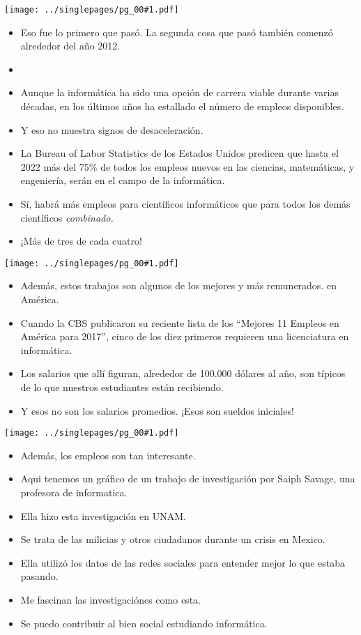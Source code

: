 \documentclass[12pt]{article}
\newcommand{\bi}{\begin{itemize}}
\newcommand{\ei}{\end{itemize}}
\newcommand{\cue}{\mbox{}
  \fbox{\sf Next slide}
}
\newcommand{\fig}[1]{
  \newpage  
  \begin{center}
    \texttt{[image: ../singlepages/pg\_00\#1.pdf]}
  \end{center}
  
}
\begin{document}
\fig{09}

\bi
\item Eso fue lo primero que pasó.
La segunda cosa que pasó también comenzó
  alrededor del año 2012.
\item \cue
\item
  Aunque la informática ha sido una opción
de carrera viable durante varias décadas, en los últimos años ha
estallado el número de empleos disponibles.
\item Y eso no muestra signos
  de desaceleración.
\item La Bureau of Labor Statistics de los Estados
Unidos predicen que hasta el 2022 más del 75\% de todos los empleos
nuevos en las ciencias, matemáticas, y engeniería, serán en el campo
de la informática.
\item
  Sí, habrá más empleos para científicos
informáticos que para todos los demás científicos {\em combinado.}

\item ¡Más de tres de cada cuatro!

\ei
\fig{10}

\bi
\item
  Además, estos trabajos son algunos de los mejores y más remunerados.
  en América.
\item Cuando la CBS publicaron su reciente lista de los
``Mejores 11 Empleos en América para 2017'', cinco de los diez
primeros requieren una licenciatura en informática. 
\item
 Los salarios que
allí figuran, alrededor de 100.000 dólares al año, son típicos de lo
que nuestros estudiantes están recibiendo.
\item
Y esos no son los salarios promedios.  ¡Esos son sueldos iniciales!
\ei

\fig{11}

\bi
\item
Además, los empleos son tan interesante.
\item
Aqui tenemos un gráfico de
un trabajo de investigación por Saiph Savage, una profesora de
informatica.
\item Ella hizo esta investigación en UNAM.
\item
Se trata de las milicias y otros ciudadanos durante un
crisis en Mexico.
\item
  Ella utilizó los datos de las redes sociales para entender
  mejor lo que estaba pasando.
\item Me fascinan las investigaciónes como esta.
\item Se puedo contribuir al bien social estudiando informática.
\ei
\end{document}
